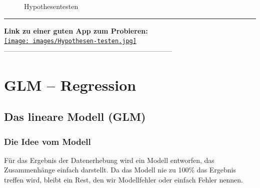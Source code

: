 \documentclass[
  10pt,
  letterpaper,
  a4paper, twoside]{scrreprt}
\begin{document}
\begin{figure}


\caption{\label{fig-Hypothesen}Hypothesentesten}

\end{figure}%

\begin{center}\rule{0.5\linewidth}{0.5pt}\end{center}

\textbf{Link zu einer guten App zum Probieren:}\\
\href{https://antoinesoetewey.shinyapps.io/statistics-201/}{\texttt{[image: images/Hypothesen-testen.jpg]}}
------------------------------------------------------------------------


\chapter{GLM -- Regression}\label{glm-regression}

\section{Das lineare Modell (GLM)}\label{das-lineare-modell-glm}

\subsection{Die Idee vom Modell}\label{die-idee-vom-modell}

Für das Ergebnis der Datenerhebung wird ein Modell entworfen, das
Zusammenhänge einfach darstellt. Da das Modell nie zu 100\% das Ergebnis
treffen wird, bleibt ein Rest, den wir Modellfehler oder einfach Fehler
nennen.
\end{document}
